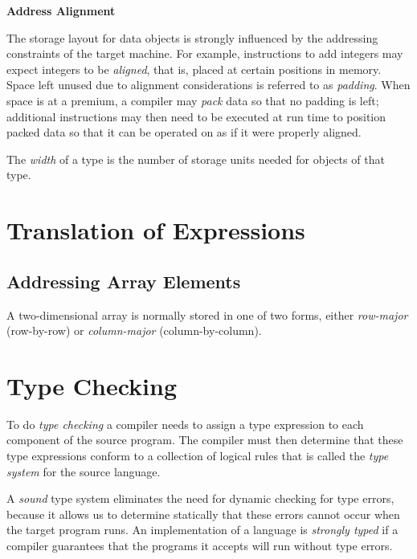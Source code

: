\documentclass[12pt,a4paper,twoside,openany]{book}
\begin{document}
\begin{framed}
    \begin{center}
        \textbf{{\large Address Alignment}}
    \end{center}
    
    The storage layout for data objects is strongly influenced by the addressing constraints of the target machine. For example, instructions to add integers may expect integers to be \textit{aligned}, that is, placed at certain positions in memory. Space left unused due to alignment considerations is referred to as \textit{padding}. When space is at a premium, a compiler may \textit{pack} data so that no padding is left; additional instructions may then need to be executed at run time to position packed data so that it can be operated on as if it were properly aligned.
\end{framed}

The \textit{width} of a type is the number of storage units needed for objects of that type.

\section{Translation of Expressions}
\subsection{Addressing Array Elements}

A two-dimensional array is normally stored in one of two forms, either \textit{row-major} (row-by-row) or \textit{column-major} (column-by-column).

\section{Type Checking}

To do \textit{type checking} a compiler needs to assign a type expression to each component of the source program. The compiler must then determine that these type expressions conform to a collection of logical rules that is called the \textit{type system} for the source language.

A \textit{sound} type system eliminates the need for dynamic checking for type errors, because it allows us to determine statically that these errors cannot occur when the target program runs. An implementation of a language is \textit{strongly typed} if a compiler guarantees that the programs it accepts will run without type errors.
\end{document}
